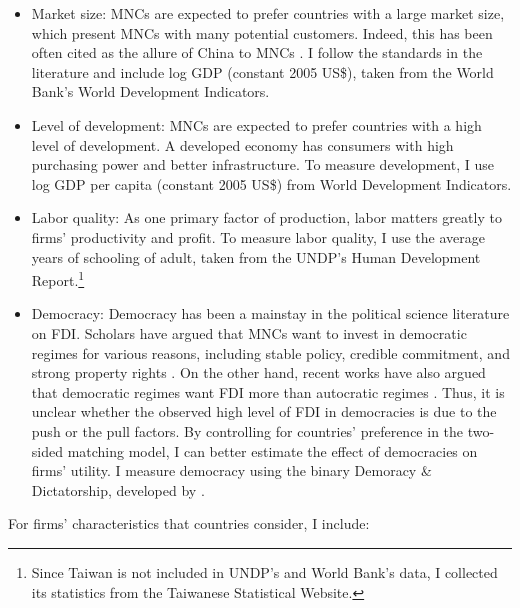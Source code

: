\begin{itemize}
\item Market size: MNCs are expected to prefer countries with a large market size, which present MNCs with many potential customers. Indeed, this has been often cited as the allure of China to MNCs \citep{Luo2010}. I follow the standards in the literature and include log GDP (constant 2005 US\$), taken from the World Bank's World Development Indicators.

\item Level of development: MNCs are expected to prefer countries with a high level of development. A developed economy has consumers with high purchasing power and better infrastructure. To measure development, I use log GDP per capita (constant 2005 US\$) from World Development Indicators.

\item Labor quality: As one primary factor of production, labor matters greatly to firms' productivity and profit. To measure labor quality, I use the average years of schooling of adult, taken from the UNDP's Human Development Report.\footnote{Since Taiwan is not included in UNDP's and World Bank's data, I collected its statistics from the Taiwanese Statistical Website.}

\item Democracy: Democracy has been a mainstay in the political science literature on FDI. Scholars have argued that MNCs want to invest in democratic regimes for various reasons, including stable policy, credible commitment, and strong property rights \citep{Ahlquist2006, Li2003, Jensen2003}. On the other hand, recent works have also argued that democratic regimes want FDI more than autocratic regimes \citep{Pandya2016}. Thus, it is unclear whether the observed high level of FDI in democracies is due to the push or the pull factors. By controlling for countries' preference in the two-sided matching model, I can better estimate the effect of democracies on firms' utility. I measure democracy using the binary Demoracy \& Dictatorship, developed by \citet{Cheibub2009b}.
\end{itemize}

For firms' characteristics that countries consider, I include:


